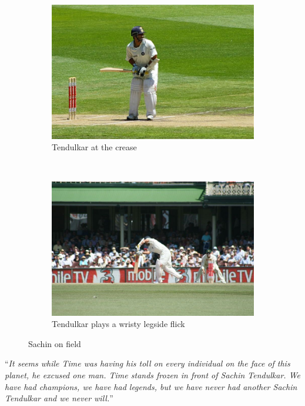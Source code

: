 \documentclass{report}
\begin{document}
		\begin{figure}[h]
		\centering
		\begin{subfigure}[t]{0.4\textwidth}
			\includegraphics[width=\textwidth]{Sachin-03}
			\caption{Tendulkar at the crease}
		\end{subfigure}	~
		\begin{subfigure}[t]{0.4\textwidth}
			\includegraphics[width=\textwidth]{Sachin-04}
			\caption{Tendulkar plays a wristy legside flick}
		\end{subfigure}
		\caption{Sachin on field}
		\label{sachinonfield}
		\end{figure}

	\vspace{0.4cm}
	``\textit{It seems while Time was having his toll on every individual on the face of this planet, he excused one man. Time stands frozen in front of Sachin Tendulkar. We have had champions, we have had legends, but we have never had another Sachin Tendulkar and we never will.}''
	
\end{document}

